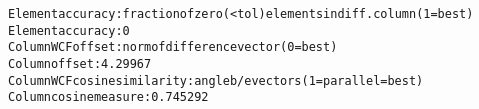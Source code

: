 \begin{alltt}
Element accuracy: fraction of zero (<tol) elements in diff. column (1=best)
Element accuracy:  0
Column WCF offset: norm of difference vector (0=best)
Column offset:  4.29967
Column WCF cosine similarity: angle b/e vectors (1=parallel=best)
Column cosine measure:  0.745292
\end{alltt}
